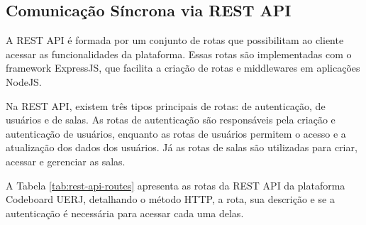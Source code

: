 \subsection{Comunicação Síncrona via REST API}

A REST API é formada por um conjunto de rotas que possibilitam ao cliente acessar as funcionalidades da plataforma. Essas rotas são implementadas com o framework ExpressJS, que facilita a criação de rotas e middlewares em aplicações NodeJS.

Na REST API, existem três tipos principais de rotas: de autenticação, de usuários e de salas. As rotas de autenticação são responsáveis pela criação e autenticação de usuários, enquanto as rotas de usuários permitem o acesso e a atualização dos dados dos usuários. Já as rotas de salas são utilizadas para criar, acessar e gerenciar as salas.

A Tabela \ref{tab:rest-api-routes} apresenta as rotas da REST API da plataforma Codeboard UERJ, detalhando o método HTTP, a rota, sua descrição e se a autenticação é necessária para acessar cada uma delas.

